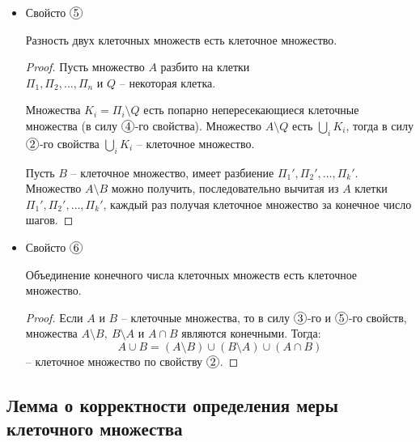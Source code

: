 \begin{itemize}
    \item Свойсто $ \circled{5} $
          \begin{statement}
              Разность двух клеточных множеств есть клеточное множество.
          \end{statement}
          \begin{proof}
              Пусть множество $A$ разбито на клетки \\ $\Pi_1,\Pi_2,\ldots,\Pi_n$ и $Q$ -- некоторая клетка.

              Множества $K_i = \Pi_i \setminus Q$ есть попарно непересекающиеся клеточные множества (в силу $ \circled{4} $-го свойства). Множество $A\setminus Q$ есть $\underset{i}{\bigcup}K_i$, тогда в силу $ \circled{2} $-го свойства $\underset{i}{\bigcup}K_i$ -- клеточное множество.

              Пусть $B$ -- клеточное множество, имеет разбиение $\Pi_1',\Pi_2',\ldots,\Pi_k'$. Множество $A\setminus B$ можно получить, последовательно вычитая из $A$ клетки $\Pi_1',\Pi_2',\ldots,\Pi_k'$, каждый раз получая клеточное множество за конечное число шагов.
          \end{proof}

    \item Свойсто $ \circled{6} $
          \begin{statement}
              Объединение конечного числа клеточных множеств есть клеточное множество.
          \end{statement}
          \begin{proof}
              Если $A$ и $B$ -- клеточные множества, то в силу $ \circled{3} $-го и $ \circled{5} $-го свойств, множества $A\setminus B, \ B \setminus A$ и $A \cap B$ являются конечными. Тогда:
              \[
                  A \cup B = (A\setminus B) \cup (B \setminus A) \cup(A \cap B)
              \]
              -- клеточное множество по свойству $ \circled{2} $.
          \end{proof}
\end{itemize}

\setcounter{subsection}{128}

\subsection{Лемма о корректности определения меры клеточного множества}

